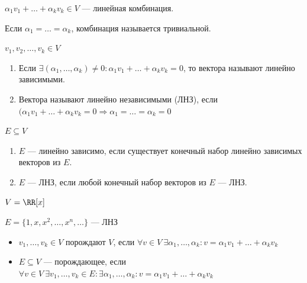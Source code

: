 \( \alpha_1 v_1 + \ldots + \alpha_k v_k \in V \) --- линейная комбинация.

Если \( \alpha_1 = \ldots = \alpha_k \), комбинация называется тривиальной.

\begin{defn}{}{}
    \( v_1, v_2, \ldots, v_k \in V \)
    \begin{enumerate}
        \item
            Если
            \(
                \exists (\alpha_1, \ldots, \alpha_k) \neq 0 : \alpha_1 v_1 + \ldots + \alpha_k v_k = 0
            \),
            то вектора называют линейно зависимыми.
        \item
            Вектора называют линейно независимыми (ЛНЗ), если
            \(
                (\alpha_1 v_1 + \ldots + \alpha_k v_k = 0 \Rightarrow \alpha_1 = \ldots = \alpha_k = 0
            \)
    \end{enumerate}
\end{defn}

\newpage

\begin{defn}{}{}
    \( E \subseteq V \)
    \begin{enumerate}
        \item
            \( E \) --- линейно зависимо, если существует конечный набор линейно зависимых векторов из \( E \).
        \item
            \( E \) --- ЛНЗ, если любой конечный набор векторов из \( E \) --- ЛНЗ.
    \end{enumerate}
\end{defn}

\begin{example}{}{}
    \( V = \RR[x] \)

    \( E = \{ 1, x, x^2, \ldots, x^n, \ldots \} \) --- ЛНЗ
\end{example}

\begin{defn}{}{}
    \begin{itemize}
        \item
            \( v_1, \ldots, v_k \in V \) порождают \( V \), если
            \( \forall v \in V \ \exists \alpha_1, \ldots, \alpha_k : v = \alpha_1 v_1 + \ldots + \alpha_k v_k \)
        \item
            \( E \subseteq V \) --- порождающее, если
            \(
                \forall v \in V \ \exists v_1, \ldots, v_k \in E :
                \exists \alpha_1, \ldots, \alpha_k : v = \alpha_1 v_1 + \ldots + \alpha_k v_k
            \)
    \end{itemize}
\end{defn}

